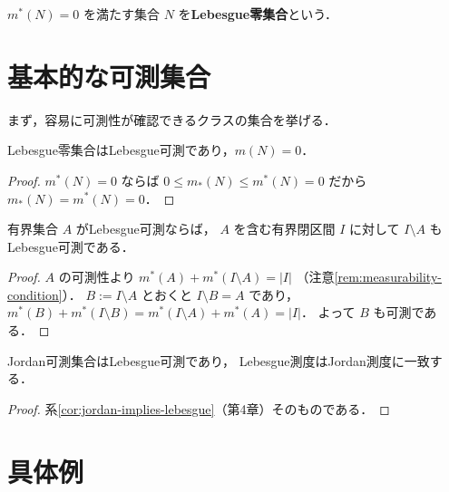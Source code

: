 \begin{definition}[Lebesgue零集合]\label{def:lebesgue-null}
$m^*(N) = 0$ を満たす集合 $N$ を\textbf{Lebesgue零集合}という．
\end{definition}

\section{基本的な可測集合}\label{sec:measurable-basic}

まず，容易に可測性が確認できるクラスの集合を挙げる．

\begin{theorem}[零集合の可測性]\label{thm:null-measurable}
Lebesgue零集合はLebesgue可測であり，$m(N) = 0$．
\end{theorem}
\begin{proof}
$m^*(N) = 0$ ならば
$0 \le m_*(N) \le m^*(N) = 0$ だから
$m_*(N) = m^*(N) = 0$．
\end{proof}

\begin{theorem}[補集合の可測性]\label{thm:complement-measurable}
有界集合 $A$ がLebesgue可測ならば，
$A$ を含む有界閉区間 $I$ に対して
$I \setminus A$ もLebesgue可測である．
\end{theorem}
\begin{proof}
$A$ の可測性より $m^*(A) + m^*(I \setminus A) = |I|$
（注意\ref{rem:measurability-condition}）．
$B := I \setminus A$ とおくと $I \setminus B = A$ であり，
$m^*(B) + m^*(I \setminus B) = m^*(I \setminus A) + m^*(A) = |I|$．
よって $B$ も可測である．
\end{proof}

\begin{theorem}[Jordan可測集合の可測性]\label{thm:jordan-implies-measurable}
Jordan可測集合はLebesgue可測であり，
Lebesgue測度はJordan測度に一致する．
\end{theorem}
\begin{proof}
系\ref{cor:jordan-implies-lebesgue}（第4章）そのものである．
\end{proof}

\section{具体例}\label{sec:measurable-examples}

